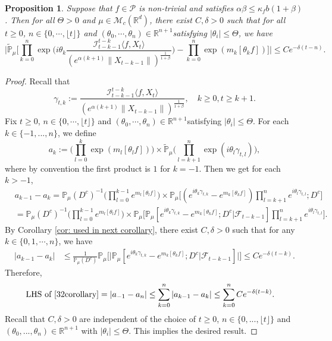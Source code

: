 \documentclass[12pt,a4paper]{amsart}
\theoremstyle{plain}
\newtheorem{prop}[thm]{Proposition}
\theoremstyle{definition}
\numberwithin{equation}{section}
\begin{document}
\begin{prop}
  \label{cor: indepedent of the limit zeta for critical and small}
  Suppose that $f\in \mathcal{P}$ is non-trivial and satisfies $\alpha\beta\leq\kappa_fb(1+\beta)$.
  Then for all $\Theta >0$ and $\mu\in \mathcal M_c(\mathbb R^d)$, there exist $C,\delta>0$ such that for all $t\geq 0$, $n \in \{0, \cdots, \lfloor t \rfloor\}$ and $(\theta_0, \cdots, \theta_n)\in \mathbb R^{n+1}$satisfying $|\theta_i|\leq \Theta$, we have
\begin{equation}
  \label{32corollary}
  \Big|\mathbb{\widetilde{P}}_{\mu}\Big[\prod_{k=0}^n\exp\Big(i\theta_k \frac {\mathcal I_{t-k-1}^{t-k}\langle f ,X_t\rangle}{(e^{\alpha (k+1)}\|X_{t-k-1}\|)^\frac{1}{1+\beta}}\Big)-\prod_{k=0}^n\exp(m_k[\theta_k f])\Big]\Big|\leq C e^{-\delta(t-n)}.
\end{equation}
\end{prop}
\begin{proof}
  Recall that \[\gamma_{t,k}:=\frac {\mathcal I_{t-k-1}^{t-k}\langle f ,X_t\rangle}{(e^{\alpha( k+1)}\|X_{t-k-1}\|)^\frac{1}{1+\beta}},\quad k \geq 0, t\geq k+1. \]
  Fix $t\geq 0$, $n \in \{0, \cdots, \lfloor t \rfloor\}$ and $(\theta_0, \cdots, \theta_n)\in \mathbb R^{n+1}$satisfying $|\theta_i|\leq \Theta$.
  For each $k\in\{-1,...,n\}$, we define
  \[
    a_k
    :=\Big(\prod_{l=0}^{k}\exp(m_l[\theta_lf])\Big) \times \mathbb{\widetilde{P}}_{\mu}\Big(\prod_{l=k+1}^{n}\exp\left(i\theta_l\gamma_{t,l}\right)\Big),
  \]
  where by convention the first product is $1$ for $k=-1$. Then we get for each $k > -1$,
  \begin{align}
    & a_{k-1} - a_k
    =\mathbb{P}_{\mu}(D^c)^{-1}\Big(\prod_{l=0}^{k-1}e^{m_l[\theta_l f]}\Big) \times \mathbb{P}_{\mu}\Big[(e^{i\theta_{k}\gamma_{t,k}}-e^{m_k[\theta_k f]})\prod_{l=k+1}^ne^{i\theta_{l}\gamma_{t,l}};D^c\Big] \\ 
    & =\mathbb{P}_{\mu}(D^c)^{-1} \Big(\prod_{l=0}^{k-1}e^{m_l[\theta_l f]}\Big) \times \mathbb{P}_{\mu}\Big[\mathbb P_\mu[e^{i\theta_{k}\gamma_{t,k}}-e^{m_k[\theta_k f]}; D^c|\mathscr F_{t-k-1}]\prod_{l=k+1}^ne^{i\theta_{l}\gamma_{t,l}}\Big].
  \end{align}
  By Corollary \ref{cor: used in next corollary}, there exist $C,\delta>0$ such that for any $k\in\{0, 1, \cdots, n\}$, we have
  \begin{align}
    | a_{k-1} - a_k|
    & \leq \frac{1}{\mathbb{P}_{\mu}(D^c)}\mathbb{P}_{\mu}\Big[\big|\mathbb P_\mu[e^{i\theta_{k}\gamma_{t,k}}-e^{m_k[\theta_k f]}; D^c\big|\mathscr{F}_{t-k-1}]\big|\Big]
    \leq C e^{-\delta(t-k)}.
  \end{align}
  Therefore,
  \begin{align}
    \text{LHS of \eqref{32corollary}}
    & = \left|a_{-1}-a_n\right|
    \leq \sum_{k=0}^n\left|a_{k-1}-a_k\right|
    \leq \sum_{k=0}^n C e^{-\delta(t-k)}.
  \end{align}
	Recall that $C, \delta>0$ are independent of the choice of $t\geq 0$, $n \in \{0,...,\lfloor t \rfloor\}$ and $(\theta_0,...,\theta_n)\in \mathbb R^{n+1}$ with $|\theta_i|\leq \Theta$.
  This implies the desired result.
\end{proof}
\end{document}
